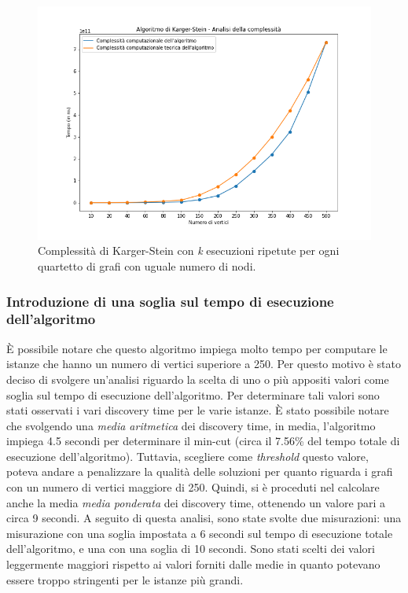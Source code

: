 \begin{figure}[H]
	\centering
	\includegraphics[width=1\textwidth]{res/images/single/karger-stein/complexity/karger_stein_complexity.png}
	\caption{Complessità di Karger-Stein con \textit{k} esecuzioni ripetute per ogni quartetto di grafi con uguale numero di nodi.}
	\label{fig:kargerstein}
\end{figure}

\subsubsection{Introduzione di una soglia sul tempo di esecuzione dell'algoritmo}

È possibile notare che questo algoritmo impiega molto tempo per computare le istanze 
che hanno un numero di vertici superiore a 250. Per questo motivo è stato 
deciso di svolgere un'analisi riguardo la scelta di uno o più appositi valori come 
soglia sul tempo di esecuzione dell'algoritmo. Per determinare tali valori sono stati 
osservati i vari discovery time per le varie istanze. È stato possibile notare che 
svolgendo una \textit{media aritmetica} dei discovery time, in media, l'algoritmo 
impiega 4.5 secondi per determinare il min-cut (circa il 7.56\% del tempo totale 
di esecuzione dell'algoritmo). Tuttavia, scegliere come \textit{threshold} questo 
valore, poteva andare a penalizzare la qualità delle soluzioni per quanto riguarda 
i grafi con un numero di vertici maggiore di 250. Quindi, si è proceduti nel calcolare 
anche la media \textit{media ponderata} dei discovery time, ottenendo un valore pari a 
circa 9 secondi. A seguito di questa analisi, sono state svolte due misurazioni: una 
misurazione con una soglia impostata a 6 secondi sul tempo di esecuzione totale 
dell'algoritmo, e una con una soglia di 10 secondi. Sono stati scelti dei valori 
leggermente maggiori rispetto ai valori forniti dalle medie in quanto potevano 
essere troppo stringenti per le istanze più grandi.

